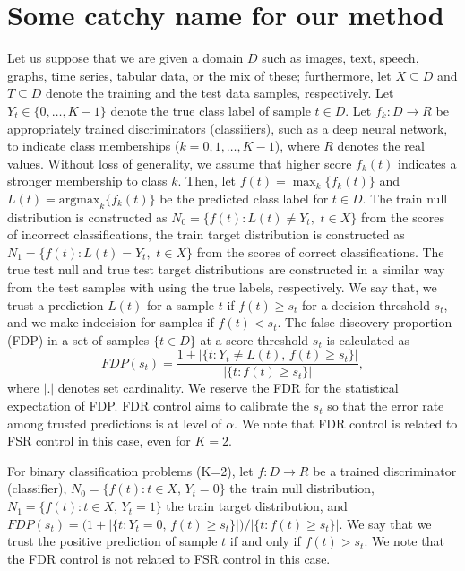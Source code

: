 \documentclass{article}
\begin{document}
\section{Some catchy name for our method}

Let us suppose that we are given a domain $D$ such as images, text, speech, graphs, time series, tabular data, or the mix of these; furthermore, let $X\subseteq D$ and $T\subseteq D$ denote the training and  the test data samples, respectively. Let $Y_t\in\{0,\dots, K-1\}$ denote the true class label of sample $t\in D$. Let $f_k:D\rightarrow R$ be appropriately trained discriminators (classifiers), such as a deep neural network, to indicate class memberships ($k=0,1,\dots,K-1$), where $R$ denotes the real values. Without loss of generality, we assume that higher score $f_k(t)$ indicates a stronger membership to class $k$. Then, let $f(t)= \max_k\{f_k(t) \}$ and $L(t)=\text{argmax}_k\{f_k(t)\}$ be the predicted class label for $t\in D$. The train null distribution is constructed as $N_0=\{f(t): L(t) \ne Y_t,\,\,  t\in X\}$ from the scores of incorrect classifications, the train target distribution is constructed as $N_1=\{f(t): L(t) = Y_t,\,\,  t\in X\}$ from the scores of correct classifications. The true test null and true test target distributions are constructed in a similar way from the test samples with using the true labels, respectively.  We say that, we trust a prediction $L(t)$ for a sample $t$  if $f(t)\ge s_t$ for a decision threshold $s_t$, and we make indecision for samples if $f(t) < s_t$. The false discovery proportion (FDP) in a set of samples $\{t\in D\}$ at a score threshold $s_t$ is calculated as 
\begin{equation}
	FDP(s_t)=\frac{1+|\{t: Y_t\ne L(t),\,f(t)\ge s_t\}|}{|\{t:f(t)\ge s_t\}|},
\end{equation}
\noindent where $|.|$ denotes set cardinality. We reserve the FDR for the statistical expectation of FDP. FDR control aims to calibrate the $s_t$ so that the error rate among trusted predictions is at level of $\alpha$. We note that FDR control is related to FSR control in this case, even for $K=2$.%

For binary classification problems (K=2), let $f:D\rightarrow R$ be a trained discriminator (classifier), $N_0=\{f(t):t\in X,\, Y_t=0\}$ the train null distribution,  $N_1=\{f(t):t\in X,\, Y_t=1\}$ the train target distribution, and $FDP(s_t)=(1+{|\{t: Y_t=0,\,f(t)\ge s_t\}|)/|\{t:f(t)\ge s_t\}|}$. We say that we trust the positive prediction of sample $t$ if and only if $f(t)>s_t$. We note that the FDR control is not related to FSR control in this case. 
\end{document}
